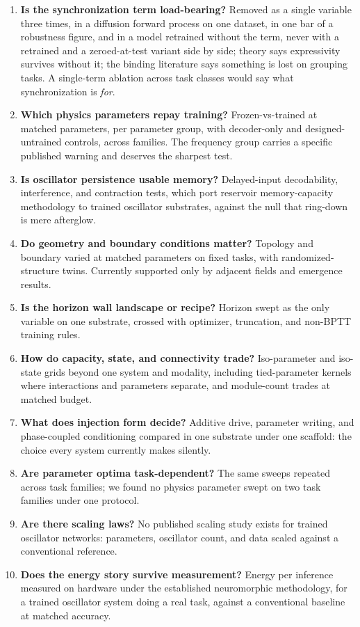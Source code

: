 \documentclass[10pt]{article}
\providecommand{\tightlist}{%
  \setlength{\itemsep}{0pt}\setlength{\parskip}{0pt}}
\begin{document}
\begin{enumerate}
\def\labelenumi{\arabic{enumi}.}
\tightlist
\item
  \textbf{Is the synchronization term load-bearing?} Removed as a single
  variable three times, in a diffusion forward process on one dataset,
  in one bar of a robustness figure, and in a model retrained without
  the term, never with a retrained and a zeroed-at-test variant side by
  side; theory says expressivity survives without it; the binding
  literature says something is lost on grouping tasks. A single-term
  ablation across task classes would say what synchronization is
  \emph{for}.
\item
  \textbf{Which physics parameters repay training?} Frozen-vs-trained at
  matched parameters, per parameter group, with decoder-only and
  designed-untrained controls, across families. The frequency group
  carries a specific published warning and deserves the sharpest test.
\item
  \textbf{Is oscillator persistence usable memory?} Delayed-input
  decodability, interference, and contraction tests, which port
  reservoir memory-capacity methodology to trained oscillator
  substrates, against the null that ring-down is mere afterglow.
\item
  \textbf{Do geometry and boundary conditions matter?} Topology and
  boundary varied at matched parameters on fixed tasks, with
  randomized-structure twins. Currently supported only by adjacent
  fields and emergence results.
\item
  \textbf{Is the horizon wall landscape or recipe?} Horizon swept as the
  only variable on one substrate, crossed with optimizer, truncation,
  and non-BPTT training rules.
\item
  \textbf{How do capacity, state, and connectivity trade?} Iso-parameter
  and iso-state grids beyond one system and modality, including
  tied-parameter kernels where interactions and parameters separate, and
  module-count trades at matched budget.
\item
  \textbf{What does injection form decide?} Additive drive, parameter
  writing, and phase-coupled conditioning compared in one substrate
  under one scaffold: the choice every system currently makes silently.
\item
  \textbf{Are parameter optima task-dependent?} The same sweeps repeated
  across task families; we found no physics parameter swept on two task
  families under one protocol.
\item
  \textbf{Are there scaling laws?} No published scaling study exists for
  trained oscillator networks: parameters, oscillator count, and data
  scaled against a conventional reference.
\item
  \textbf{Does the energy story survive measurement?} Energy per
  inference measured on hardware under the established neuromorphic
  methodology, for a trained oscillator system doing a real task,
  against a conventional baseline at matched accuracy.
\end{enumerate}
\end{document}
